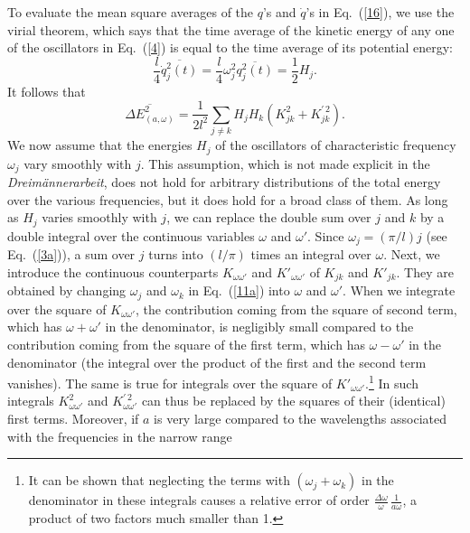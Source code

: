\documentclass[12pt]{elsart}
\begin{document}
To evaluate the mean square averages of the $q$'s and $\dot{q}$'s in Eq.\ (\ref{16}), we use the virial theorem, which says that the time average of the kinetic energy of any one of the oscillators in Eq.\ (\ref{4}) is equal to the time average of its potential energy:
\begin{equation}
\frac{l}{4} \overline{ \dot{q}_j^2(t) } = \frac{l}{4} \omega_j^2 \overline {q_j^2(t)} = \frac{1}{2} H_j.
\label{16b}
\end{equation}
It follows that
\begin{equation}
\overline{\Delta E_{(a, \omega)}^2}  =
 \frac{1}{2l^2} \sum_{j \neq k} H_j H_k \left( K^2_{jk} + K^{\prime \, 2}_{jk} \right).
\label{q14}
\end{equation}
We now assume 
that the energies $H_j$ of the oscillators of characteristic frequency $\omega_j$ vary smoothly with $j$. This assumption, which is not made explicit in the {\it Dreim\"annerarbeit}, does not hold for arbitrary distributions of the total energy over the various frequencies, but it does hold for a broad class of them.
As long as $H_j$ varies smoothly with $j$, we can replace the double sum over $j$ and $k$ by a double integral over the continuous variables $\omega$ and $\omega'$. Since $\omega_j = (\pi/l) j$ (see Eq.\ (\ref{3a})), a sum over $j$ turns into $(l/\pi)$ times an integral over $\omega$. Next, we introduce the continuous counterparts $K_{\omega \omega'}$ and $K'_{\omega \omega'}$ of $K_{jk}$ and $K'_{jk}$. They are obtained by changing $\omega_j$ and $\omega_k$ in Eq.\ (\ref{11a}) into $\omega$ and $\omega'$.
When we integrate over the square of $K_{\omega \omega'}$, the contribution coming from the square of second term, which has $\omega + \omega'$ in the denominator, is negligibly small compared to the contribution coming from the square of the first term, which has $\omega - \omega'$ in the denominator (the integral over the product of the first and the second term vanishes). The same is true for integrals over the square of $K'_{\omega \omega'}$.\footnote{It can be shown that neglecting the terms with $(\omega_j + \omega_k)$ in the denominator in these integrals causes a relative error of order $\displaystyle{ \frac{\Delta\omega}{\omega}\, \frac{1}{a\omega}}$, a product of two factors much smaller than 1.\label{small}} In such integrals $K^2_{\omega \omega'}$ and $K^{\prime \, 2}_{\omega \omega'}$ can thus be replaced by the squares of their (identical) first terms. Moreover, if $a$ is very large compared to the wavelengths associated with the frequencies in the narrow range 
\end{document}
